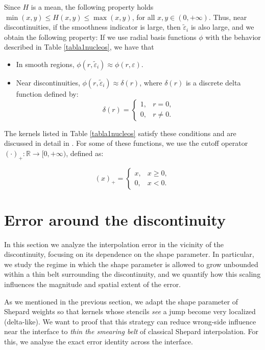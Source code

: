 \documentclass[preprint]{elsarticle}       %
\begin{document}
Since $H$ is a mean, the following property holds  $\min(x,y)\leq H(x,y)\leq \max(x,y)$, for all $x,y\in(0,+\infty)$. Thus, near discontinuities, if the smoothness indicator is large, then 
$\tilde{\varepsilon}_i$ is also large, and we obtain the following property: If we use radial basis functions $\phi$ with the behavior described in Table \ref{tabla1nucleos},  we have that
\begin{itemize}
\item In smooth regions, $\phi(r, \tilde{\varepsilon}_i) \approx \phi(r, \varepsilon)$.
\item Near discontinuities, $\phi(r, \tilde{\varepsilon}_i) \approx \delta(r)$, where $\delta(r)$ is a discrete delta function defined by:
\[
\delta(r) =
\begin{cases}
1, & r = 0, \\
0, & r \neq 0.
\end{cases}
\]
\end{itemize}
The kernels listed in Table \ref{tabla1nucleos} satisfy these conditions and are discussed in detail in \cite{Fasshauer2007}. For some of these functions, we use the cutoff operator $(\cdot)_+ : \mathbb{R} \to [0,+\infty)$, defined as:

 \begin{equation*}
 (x)_+=\begin{cases}
 x, & x\geq 0,\\
 0, & x<0.
 \end{cases}
 \end{equation*}

\section{Error around the discontinuity}
In this section we analyze the interpolation error in the vicinity of the discontinuity, focusing on its dependence on the shape parameter. In particular, we study the regime in which the shape parameter is allowed to grow unbounded within a thin belt surrounding the discontinuity, and we quantify how this scaling influences the magnitude and spatial extent of the error.





As we mentioned in the previous section, we adapt the shape parameter of Shepard weights so that kernels whose stencils \emph{see} a jump
become very localized (delta-like). We want to proof that this strategy can reduce wrong-side influence near the interface to
\emph{thin the smearing belt} of classical Shepard interpolation. For this, we analyse the exact error identity across the interface. 
\end{document}
